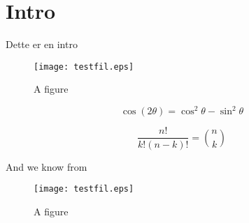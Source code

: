 \chapter{Intro}
Dette er en intro



\begin{figure}[H]
	\centering
	\texttt{[image: testfil.eps]}
	\caption{A figure}\label{fig:testfil}
\end{figure}


\lipsum[3-56]

\[
\cos (2\theta) = \cos^2 \theta - \sin^2 \theta
\]

\[
\frac{n!}{k!(n-k)!} = \binom{n}{k}
\]

And we know from \cite{Nobody06}

\begin{figure}[H]
  \centering
  \texttt{[image: testfil.eps]}
  \caption{A figure}\label{fig:testfil}
\end{figure}


